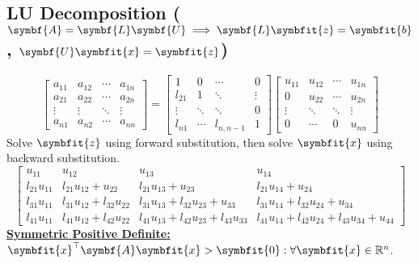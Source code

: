 \documentclass{article}
\begin{document}
\begin{minipage}[t]{126.1962963mm}
    \subsection{LU Decomposition (\texorpdfstring{\(\symbf{A} = \symbf{L} \symbf{U} \implies \symbf{L} \symbfit{z} = \symbfit{b}\), \(\symbf{U} \symbfit{x} = \symbfit{z}\)}{A = LU => L z = b, U x = z})}
    \begin{equation*}
        \begin{bmatrix}
            a_{11} & a_{12} & \cdots & a_{1n} \\
            a_{21} & a_{22} & \cdots & a_{2n} \\
            \vdots & \vdots & \ddots & \vdots \\
            a_{n1} & a_{n2} & \cdots & a_{nn}
        \end{bmatrix} =
        \begin{bmatrix}
            1      & 0      & \cdots    & 0      \\
            l_{21} & 1      & \ddots    & \vdots \\
            \vdots & \ddots & \ddots    & 0      \\
            l_{n1} & \cdots & l_{n,n-1} & 1
        \end{bmatrix}
        \begin{bmatrix}
            u_{11} & u_{12} & \cdots & u_{1n} \\
            0      & u_{22} & \cdots & u_{2n} \\
            \vdots & \ddots & \ddots & \vdots \\
            0      & \cdots & 0      & u_{nn}
        \end{bmatrix}
    \end{equation*}
    Solve \(\symbfit{z}\) using forward substitution, then solve \(\symbfit{x}\) using backward substitution.
    \begin{equation*}
        \begin{bmatrix}
            u_{11}        & u_{12}                      & u_{13}                                    & u_{14}                                           \\
            l_{21} u_{11} & l_{21} u_{12}+u_{22}        & l_{21} u_{13}+u_{23}                      & l_{21} u_{14}+u_{24}                             \\
            l_{31} u_{11} & l_{31} u_{12}+l_{32} u_{22} & l_{31} u_{13}+l_{32} u_{23}+u_{33}        & l_{31} u_{14}+l_{32} u_{24}+u_{34}               \\
            l_{41} u_{11} & l_{41} u_{12}+l_{42} u_{22} & l_{41} u_{13}+l_{42} u_{23}+l_{43} u_{33} & l_{41} u_{14}+l_{42} u_{24}+l_{43} u_{34}+u_{44}
        \end{bmatrix}
    \end{equation*}
    \underline{\textbf{Symmetric Positive Definite:}} \(\symbfit{x}^\top \symbf{A} \symbfit{x} > \symbfit{0} : \forall \symbfit{x} \in \mathbb{R}^n\).

\end{minipage}
\end{document}
